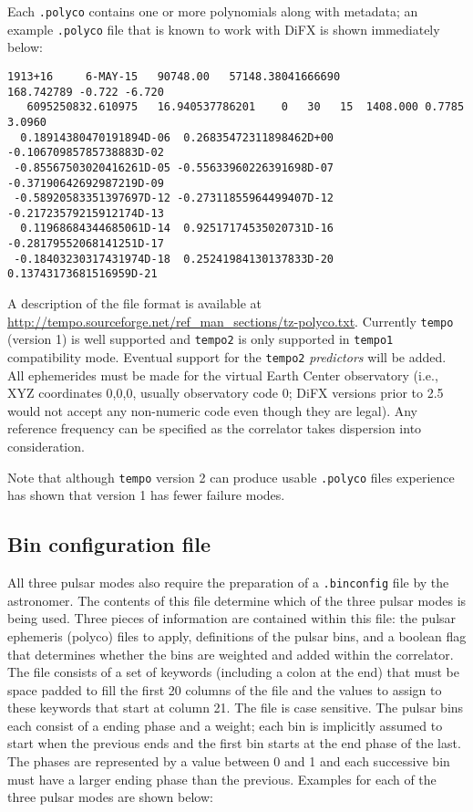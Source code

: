 Each {\tt .polyco} contains one or more polynomials along with metadata; an example {\tt .polyco} file that is known to work with DiFX is shown immediately below:
\begin{verbatim}
1913+16     6-MAY-15   90748.00   57148.38041666690           168.742789 -0.722 -6.720
   6095250832.610975   16.940537786201    0   30   15  1408.000 0.7785   3.0960
  0.18914380470191894D-06  0.26835472311898462D+00 -0.10670985785738883D-02
 -0.85567503020416261D-05 -0.55633960226391698D-07 -0.37190642692987219D-09
 -0.58920583351397697D-12 -0.27311855964499407D-12 -0.21723579215912174D-13
  0.11968684344685061D-14  0.92517174535020731D-16 -0.28179552068141251D-17
 -0.18403230317431974D-18  0.25241984130137833D-20  0.13743173681516959D-21
\end{verbatim}
\noindent
A description of the file format is available at \url{http://tempo.sourceforge.net/ref_man_sections/tz-polyco.txt}.
Currently {\tt tempo} (version 1) is well supported and {\tt tempo2} is only supported in {\tt tempo1} compatibility mode.
Eventual support for the {\tt tempo2} {\em predictors} will be added.
All ephemerides must be made for the virtual Earth Center observatory (i.e., XYZ coordinates 0,0,0, usually observatory code 0; DiFX versions prior to 2.5 would not accept any non-numeric code even though they are legal).
Any reference frequency can be specified as the correlator takes dispersion into consideration.

Note that although {\tt tempo} version 2 can produce usable {\tt .polyco} files experience has shown that version 1 has fewer failure modes.

\subsection{Bin configuration file}

All three pulsar modes also require the preparation of a {\tt .binconfig} file by the astronomer.
The contents of this file determine which of the three pulsar modes is being used.
Three pieces of information are contained within this file: the pulsar ephemeris (polyco) files to apply, definitions of the pulsar bins, and a boolean flag that determines whether the bins are weighted and added within the correlator.
The file consists of a set of keywords (including a colon at the end) that must be space padded to fill the first 20 columns of the file and the values to assign
to these keywords that start at column 21.
The file is case sensitive.
The pulsar bins each consist of a ending phase and a weight; each bin is implicitly assumed to start when the previous ends and the first bin starts at the end phase of the last.
The phases are represented by a value between 0 and 1 and each successive bin must have a larger ending phase than the previous.
Examples for each of the three pulsar modes are shown below:


